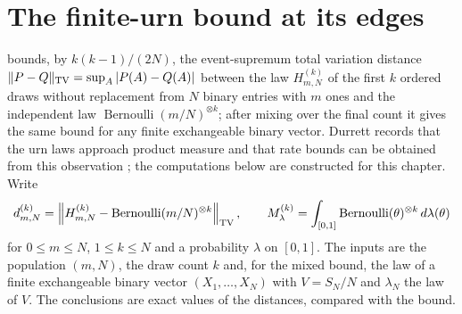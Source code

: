 \section{The finite-urn bound at its edges}
\label{sec:p15-w02c-p15-022-urn}

 bounds, by \(k(k-1)/(2N)\),
the event-supremum total variation distance
\(\|P-Q\|_{\rm TV}=\sup_A|P(A)-Q(A)|\) between the law
\(H_{m,N}^{(k)}\) of the first \(k\) ordered draws without replacement
from \(N\) binary entries with \(m\) ones and the independent law
\(\operatorname{Bernoulli}(m/N)^{\otimes k}\); after mixing over the
final count it gives the same bound for any finite exchangeable binary
vector. Durrett records that the urn laws approach product measure and
that rate bounds can be obtained from this observation
\cite[p.~255]{DurrettPTEAuthor2019}; the computations below are
constructed for this chapter. Write
\[
 d_{m,N}^{(k)}=\left\|H_{m,N}^{(k)}
     -\operatorname{Bernoulli}(m/N)^{\otimes k}\right\|_{\rm TV},
 \qquad
 M_\lambda^{(k)}=\int_{[0,1]}\operatorname{Bernoulli}(\theta)^{\otimes k}
     \,d\lambda(\theta)
\]
for \(0\leq m\leq N\), \(1\leq k\leq N\) and a probability \(\lambda\)
on \([0,1]\). The inputs are the population \((m,N)\), the draw count
\(k\) and, for the mixed bound, the law of a finite exchangeable binary
vector \((X_1,\ldots,X_N)\) with \(V=S_N/N\) and \(\lambda_N\) the law
of \(V\). The conclusions are exact values of the distances, compared
with the bound.

